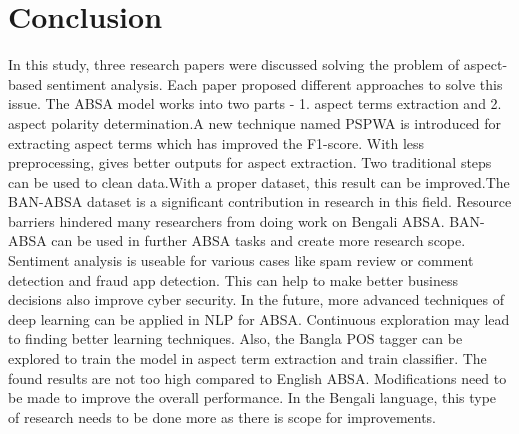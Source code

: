 \documentclass[a4paper,12pt]{article}
\begin{document}
\section{Conclusion}
In this study, three research papers were discussed solving the problem of aspect-based sentiment analysis. Each paper proposed different approaches to solve this issue.\newline
The ABSA model works into two parts - 1. aspect terms extraction and
2. aspect polarity determination.A new technique named PSPWA is introduced for extracting aspect terms which has improved the F1-score.\newline
With less preprocessing, gives better outputs for aspect extraction. Two traditional steps can be used to clean data.With a proper dataset, this result can be improved.The BAN-ABSA dataset\cite{third} is a significant contribution in research in this field.\newline
Resource barriers hindered many researchers from doing work on Bengali ABSA. BAN-ABSA\cite{third} can be used in further ABSA tasks and create more research scope.\newline
Sentiment analysis is useable for various cases like spam review or comment detection and fraud app detection. This can help to make better business decisions also improve cyber security.\newline
In the future,  more advanced techniques of deep learning can be applied in NLP for ABSA. Continuous exploration may lead to finding better learning techniques. Also, the Bangla POS tagger can be explored to train the model in aspect term extraction and train classifier.\newline
The found results are not too high compared to English ABSA. Modifications need to be made to improve the overall performance. In the Bengali language, this type of research needs to be done more as there is scope for improvements.




\newpage
\end{document}
